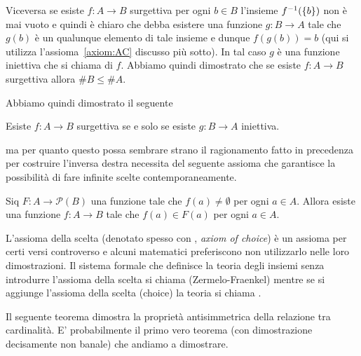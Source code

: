 Viceversa se esiste $f\colon A\to B$ surgettiva 
per ogni $b\in B$ l'insieme $f^{-1}({\left\{ b \right\}})$ non è mai 
vuoto e quindi è chiaro che debba esistere 
una funzione $g\colon B\to A$ tale che $g(b)$ è un qualunque elemento 
di tale insieme e dunque $f(g(b)) = b$
(qui si utilizza l'assioma~\ref{axiom:AC} discusso più sotto). 
In tal caso $g$ è una funzione iniettiva che 
si chiama  di $f$.
Abbiamo quindi dimostrato che se esiste $f\colon A\to B$
surgettiva allora $\#B \le \#A$.

Abbiamo quindi dimostrato il seguente
%
\begin{theorem}\label{th:95444}
Esiste $f\colon A\to B$ surgettiva 
se e solo se esiste $g\colon B\to A$ iniettiva.
\end{theorem}
% 
ma per quanto questo possa sembrare strano
il ragionamento fatto in precedenza per costruire l'inversa destra
necessita del seguente assioma che garantisce la possibilità di 
fare infinite scelte contemporaneamente.

\begin{axiom}%
  \label{axiom:AC}%
  Siq $F\colon A \to \mathcal P(B)$
  una funzione tale che $f(a)\neq \emptyset$ 
  per ogni $a\in A$. Allora esiste una funzione
  $f\colon A \to B$ tale che $f(a)\in F(a)$
  per ogni $a\in A$.
\end{axiom}

L'assioma della scelta (denotato spesso con , \emph{axiom of choice})
è un assioma per certi versi controverso
e alcuni matematici preferiscono non utilizzarlo nelle loro dimostrazioni.
Il sistema formale che definisce la teoria degli insiemi senza 
introdurre l'assioma della scelta 
si chiama  (Zermelo-Fraenkel) mentre 
se si aggiunge l'assioma della scelta (choice) la teoria si chiama 
.

Il seguente teorema dimostra la proprietà antisimmetrica 
della relazione tra cardinalità. 
E' probabilmente il primo vero teorema (con dimostrazione decisamente non banale) 
che andiamo a dimostrare.

